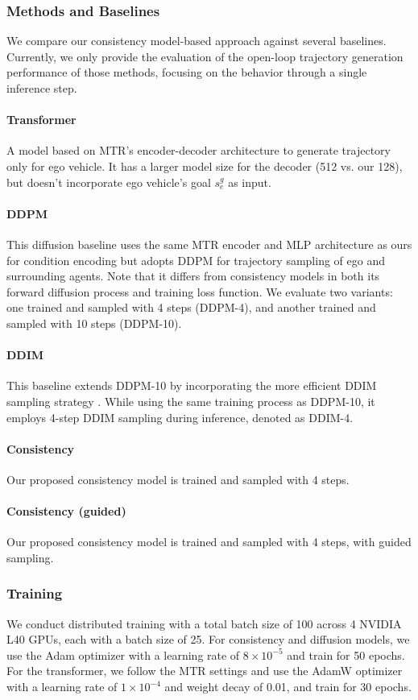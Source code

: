 \subsubsection{\textbf{Methods and Baselines}}

We compare our consistency model-based approach against several baselines.
Currently, we only provide the evaluation of the open-loop trajectory generation performance of those methods, focusing on the behavior through a single inference step.
\paragraph{\textbf{Transformer}} A model based on MTR's encoder-decoder architecture \citep{shi2022motion} to generate trajectory only for ego vehicle.
It has a larger model size for the decoder (512 vs. our 128), but doesn't incorporate ego vehicle's goal $s_e^g$ as input.
\paragraph{\textbf{DDPM}} This diffusion baseline uses the same MTR encoder and MLP architecture as ours for condition encoding but adopts DDPM \citep{ho2020denoising} for trajectory sampling of ego and surrounding agents. 
Note that it differs from consistency models in both its forward diffusion process and training loss function.
We evaluate two variants: one trained and sampled with 4 steps (DDPM-4), and another trained and sampled with 10 steps (DDPM-10).
\paragraph{\textbf{DDIM}}  This baseline extends DDPM-10 by incorporating the more efficient DDIM sampling strategy \citep{song2020denoising}.
While using the same training process as DDPM-10, it employs 4-step DDIM sampling during inference, denoted as DDIM-4.
\paragraph{\textbf{Consistency}} Our proposed consistency model is trained and sampled with 4 steps.
\paragraph{\textbf{Consistency (guided)}} Our proposed consistency model is trained and sampled with 4 steps, with guided sampling.

\subsubsection{\textbf{Training}}
We conduct distributed training with a total batch size of 100 across 4 NVIDIA L40 GPUs, each with a batch size of 25.
For consistency and diffusion models, we use the Adam optimizer \citep{kingma2014adam} with a learning rate of $8\times10^{-5}$ and train for 50 epochs.
For the transformer, we follow the MTR settings \citep{shi2022motion} and use the AdamW optimizer \citep{loshchilov2017decoupled} with a learning rate of $1\times10^{-4}$ and weight decay of 0.01, and train for 30 epochs.

